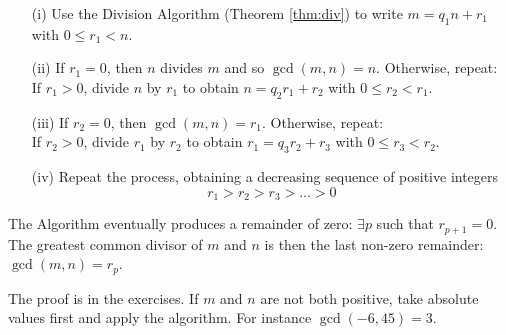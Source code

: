 \begin{itemize}
\item[(i)] Use the Division Algorithm (Theorem \ref{thm:div}) to write $m=q_1n+r_1$ with $0\le r_1<n$.
\item[(ii)] If $r_1=0$, then $n$ divides $m$ and so $\gcd(m,n)=n$. Otherwise, repeat:\\
	If $r_1>0$, divide $n$ by $r_1$ to obtain $n=q_2r_1+r_2$ with $0\le r_2<r_1$.
\item[(iii)] If $r_2=0$, then $\gcd(m,n)=r_1$. Otherwise, repeat:\\
	If $r_2>0$, divide $r_1$ by $r_2$ to obtain $r_1=q_3r_2+r_3$ with $0\le r_3<r_2$.
\item[(iv)] Repeat the process, obtaining a decreasing sequence of positive integers
\[r_1>r_2>r_3>\ldots>0\]
\end{itemize}


\begin{thm}\label{thm:euclidalg}
The Algorithm eventually produces a remainder of zero: $\exists p$ such that $r_{p+1}=0$. The greatest common divisor of $m$ and $n$ is then the last non-zero remainder: $\gcd(m,n)=r_p$.
\end{thm}

\noindent The proof is in the exercises. If $m$ and $n$ are not both positive, take absolute values first and apply the algorithm. For instance $\gcd(-6,45)=3$.

